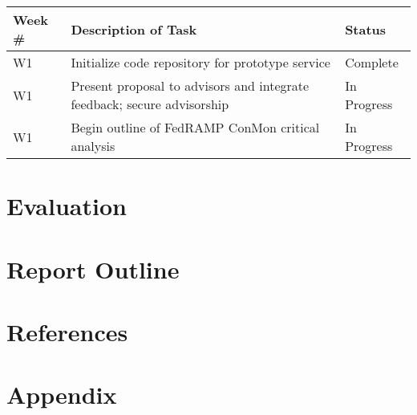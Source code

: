 \documentclass{jdf}
\begin{document}
\begin{tabular}{||l l l||} 
    \hline
    Week \# & Description of Task & Status \\ [0.5ex] 
    \hline
    W1 & Initialize code repository for prototype service & Complete \\
    \hline
    W1 & Present proposal to advisors and integrate feedback; secure advisorship & In Progress \\
    \hline
    W1 & Begin outline of FedRAMP ConMon critical analysis & In Progress \\
    \hline
\end{tabular}

\section{Evaluation}

\section{Report Outline}

\section{References}

\nocite{*}



\section{Appendix}
\end{document}
